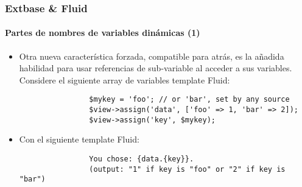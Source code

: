 \begin{frame}[fragile]
	\frametitle{Extbase \& Fluid}
	\framesubtitle{Partes de nombres de variables dinámicas (1)}

	\lstset{basicstyle=\tiny\ttfamily}

	\begin{itemize}

		\item Otra nueva característica forzada, compatible para atrás, es la añadida
			habilidad para usar referencias de sub-variable al acceder a sus variables.
			Considere el siguiente array de variables template Fluid:

			\begin{lstlisting}
				$mykey = 'foo'; // or 'bar', set by any source
				$view->assign('data', ['foo' => 1, 'bar' => 2]);
				$view->assign('key', $mykey);
			\end{lstlisting}

		\item Con el siguiente template Fluid:

			\begin{lstlisting}
				You chose: {data.{key}}.
				(output: "1" if key is "foo" or "2" if key is "bar")
			\end{lstlisting}

	\end{itemize}

\end{frame}


